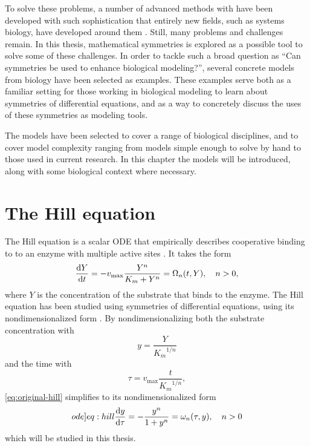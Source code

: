 To solve these problems, a number of advanced methods with have been developed with such sophistication that entirely new fields, such as systems biology, have developed around them \cite{kitano2002systems,westerhoff2004evolution}.
Still, many problems and challenges remain.
In this thesis, mathematical symmetries is explored as a possible tool to solve some of these challenges.
In order to tackle such a broad question as \enquote{Can symmetries be used to enhance biological modeling?}, several concrete models from biology have been selected as examples.
These examples serve both as a familiar setting for those working in biological modeling to learn about symmetries of differential equations, and as a way to concretely discuss the uses of these symmetries as modeling tools.

The models have been selected to cover a range of biological disciplines, and to cover model complexity ranging from models simple enough to solve by hand to those used in current research.
In this chapter the models will be introduced, along with some biological context where necessary.

\section{The Hill equation}

The Hill equation is a scalar ODE that empirically describes cooperative binding to to an enzyme with multiple active sites \cite{weiss1997hill}. %
It takes the form
\begin{equation} \label{eq:original-hill}
  \diff{Y}{t} = - v_\text{max} \frac{Y^n}{K_m + Y^n} = \Omega_n(t, Y), \quad
  n > 0,
\end{equation}
where \(Y\) is the concentration of the substrate that binds to the enzyme. %
The Hill equation has been studied using symmetries of differential equations, using its nondimensionalized form \cite{ohlsson2020symmetry}.
By nondimensionalizing both the substrate concentration with
\begin{equation*}
  y = \frac{Y}{{K_m}^{1/n}}
\end{equation*}
and the time with
\begin{equation*}
  \tau = v_\text{max} \frac{t}{{K_m}^{1/n}},
\end{equation*}
\cref{eq:original-hill} simplifies to its nondimensionalized form
\begin{equation} \label[ode]{eq:hill}
  \diff{y}{\tau} = - \frac{y^n}{1 + y^n} = \omega_n(\tau, y), \quad
  n > 0
\end{equation}
which will be studied in this thesis.

